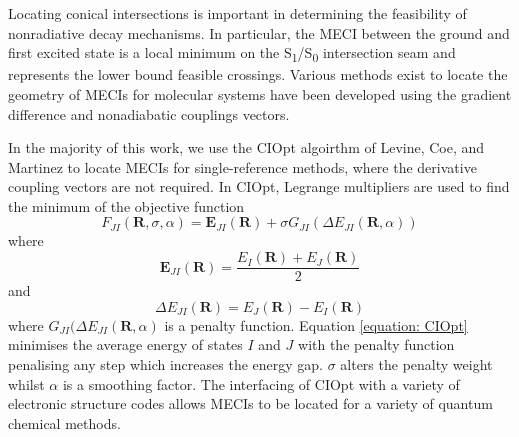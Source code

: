 Locating conical intersections is important in determining the feasibility of nonradiative decay mechanisms.\cite{Domcke2011} In particular, the \ac{MECI} between the ground and first excited state is a local minimum on the S\textsubscript{1}/S\textsubscript{0} intersection seam and represents the lower bound feasible crossings. Various methods exist to locate the geometry of \acp{MECI} for molecular systems have been developed using the gradient difference and nonadiabatic couplings vectors.\cite{Koga1985,Manaa1993,Bearpark1994,Dallos2004,Yarkony2004} 

In the majority of this work, we use the CIOpt algoirthm of Levine, Coe, and Martinez to locate \acp{MECI} for single-reference methods, where the derivative coupling vectors are not required.\cite{Levine2008} In CIOpt, Legrange multipliers are used to find the minimum of the objective function
\begin{equation}\label{equation: CIOpt}
F_{JI}(\bm{R},\sigma{},\alpha{})=\bm{E}_{JI}(\bm{R})+\sigma{}G_{JI}(\Delta{}E_{JI}(\bm{R},\alpha))
\end{equation}
where 
\begin{equation}
    \bm{E}_{JI}(\bm{R})=\frac{E_{I}(\bm{R})+E_{J}(\bm{R})}{2}
\end{equation}
and
\begin{equation}
    \Delta{}E_{JI}(\bm{R})=E_{J}(\bm{R})-E_{I}(\bm{R})
\end{equation}
where $G_{JI}(\Delta{}E_{JI}(\bm{R},\alpha)$ is a penalty function. Equation \ref{equation: CIOpt} minimises the average energy of states $I$ and $J$ with the penalty function penalising any step which increases the energy gap.  $\sigma$ alters the penalty weight whilst $\alpha$ is a smoothing factor. The interfacing of CIOpt with a variety of electronic structure codes allows \acp{MECI} to be located for a variety of quantum chemical methods. 

